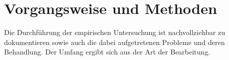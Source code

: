 

\chapter{Vorgangsweise und Methoden} \label{cha:designAndDevelopment}

Die Durchführung der empirischen Untersuchung ist nachvollziehbar zu dokumentieren sowie auch die dabei aufgetretenen Probleme und deren Behandlung.
Der Umfang ergibt sich aus der Art der Bearbeitung. 




